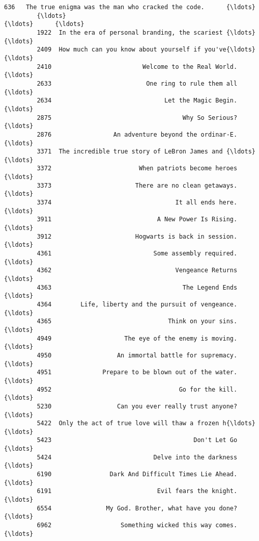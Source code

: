 \documentclass[11pt]{article}
\begin{document}
\begin{Verbatim}[commandchars=\\\{\}]
         636   The true enigma was the man who cracked the code.      {\ldots}        
         {\ldots}                                                 {\ldots}      {\ldots}        
         1922  In the era of personal branding, the scariest {\ldots}      {\ldots}        
         2409  How much can you know about yourself if you've{\ldots}      {\ldots}        
         2410                         Welcome to the Real World.      {\ldots}        
         2633                          One ring to rule them all      {\ldots}        
         2634                               Let the Magic Begin.      {\ldots}        
         2875                                    Why So Serious?      {\ldots}        
         2876                 An adventure beyond the ordinar-E.      {\ldots}        
         3371  The incredible true story of LeBron James and {\ldots}      {\ldots}        
         3372                        When patriots become heroes      {\ldots}        
         3373                       There are no clean getaways.      {\ldots}        
         3374                                  It all ends here.      {\ldots}        
         3911                             A New Power Is Rising.      {\ldots}        
         3912                       Hogwarts is back in session.      {\ldots}        
         4361                            Some assembly required.      {\ldots}        
         4362                                  Vengeance Returns      {\ldots}        
         4363                                    The Legend Ends      {\ldots}        
         4364        Life, liberty and the pursuit of vengeance.      {\ldots}        
         4365                                Think on your sins.      {\ldots}        
         4949                    The eye of the enemy is moving.      {\ldots}        
         4950                  An immortal battle for supremacy.      {\ldots}        
         4951              Prepare to be blown out of the water.      {\ldots}        
         4952                                   Go for the kill.      {\ldots}        
         5230                  Can you ever really trust anyone?      {\ldots}        
         5422  Only the act of true love will thaw a frozen h{\ldots}      {\ldots}        
         5423                                       Don't Let Go      {\ldots}        
         5424                            Delve into the darkness      {\ldots}        
         6190                Dark And Difficult Times Lie Ahead.      {\ldots}        
         6191                             Evil fears the knight.      {\ldots}        
         6554               My God. Brother, what have you done?      {\ldots}        
         6962                   Something wicked this way comes.      {\ldots}        
         

\end{Verbatim}
\end{document}
